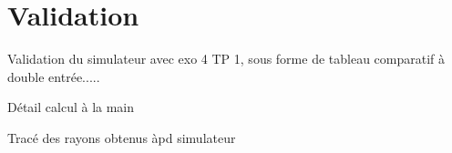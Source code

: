\chapter{Validation}
\label{chaper-3}

Validation du simulateur avec exo 4 TP 1, sous forme de tableau comparatif à double entrée.....

Détail calcul à la main

Tracé des rayons obtenus àpd simulateur